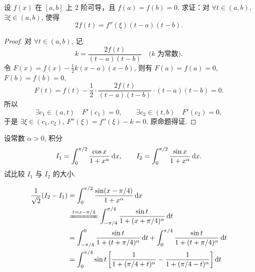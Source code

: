 \begin{exercise}[$k$ 值法]
    设 $f(x)$ 在 $[a, b]$ 上 $2$ 阶可导，且 $f(a) = f(b) = 0$. 求证：对 $\forall t \in (a, b)$, $\exists \xi \in (a, b)$, 使得
    \[
        2f(t) = f''(\xi) (t - a) (t - b).
    \]
\end{exercise}

\begin{proof}
    对 $\forall t \in (a, b)$, 记
    \[
        k = \frac{2f(t)}{(t - a)(t - b)} \quad\text{($k$ 为常数)}.
    \]
    令 $F(x) = f(x) - \frac 12 k(x - a)(x - b)$, 则有 $F(a) = f(a) = 0$, $F(b) = f(b) = 0$, 
    \[
        F(t) = f(t) - \frac 12 \cdot \frac{2f(t)}{(t - a)(t - b)} \cdot (t - a)(t - b)
        = 0.
    \]
    所以
    \[
        \exists c_1 \in (a, t) \quad F'(c_1) = 0,
        \qquad
        \exists c_2 \in (t, b) \quad F'(c_2) = 0,
    \]
    于是 $\exists \xi \in (c_1, c_2)$, $F''(\xi) = f''(\xi) - k = 0$, 原命题得证.
\end{proof}

\begin{exercise}
    设常数 $\alpha > 0$, 积分
    \[
        I_1 = \int_0^{\pi / 2} \frac{\cos x}{1 + x^\alpha} \mathop{}\!\mathrm{d} x,
        \qquad
        I_2 = \int_0^{\pi / 2} \frac{\sin x}{1 + x^\alpha} \mathop{}\!\mathrm{d} x.
    \]
    试比较 $I_1$ 与 $I_2$ 的大小.
\end{exercise}

\begin{align*}
    \frac{1}{\sqrt{2}}(I_2 - I_1)
    &= \int_0^{\pi / 2} \frac{\sin(x - \pi/4)}{1 + x^\alpha} \dx \\
    &\xlongequal{t = x - \pi/4} \int_{-\pi/4}^{\pi/4} \frac{\sin t}{1 + (x + \pi/4)^\alpha} \dt \\
    &= \int_{-\pi/4}^{0} \frac{\sin t}{1 + (t + \pi/4)^\alpha} \dt
        + \int_{0}^{\pi/4} \frac{\sin t}{1 + (t + \pi/4)^\alpha} \dt \\
    &= \int_{0}^{\pi/4} \sin t \sbr[3]{\frac{1}{1 + (\pi/4 + t)^\alpha}
        - \frac{1}{1 + (\pi/4 - t)^\alpha}} \dt \\
\end{align*}
